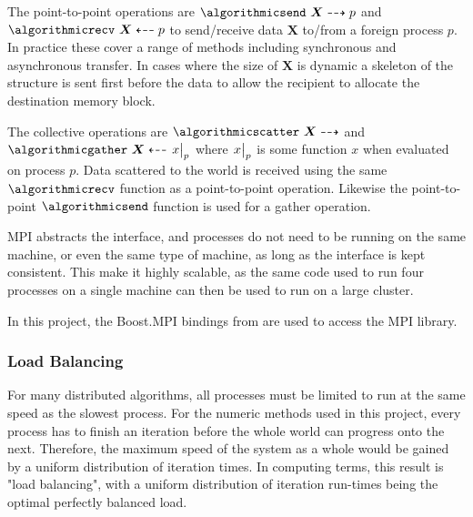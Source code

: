 \documentclass[twoside]{IIBproject}
\newcommand{\vect} [1] {\bm{#1}}
\newcommand{\dra}{\dashrightarrow}
\newcommand{\dla}{\dashleftarrow}
\numberwithin{figure}{section}
\begin{document}
            The point-to-point operations are $\algorithmicsend\ \vect{X} \dra p$ and $\algorithmicrecv\ \vect{X} \dla p$ to send/receive data $\vect{X}$ to/from a foreign process $p$. In practice these cover a range of methods including synchronous and asynchronous transfer. In cases where the size of $\vect{X}$ is dynamic a skeleton of the structure is sent first before the data to allow the recipient to allocate the destination memory block. 

            The collective operations are $\algorithmicscatter\ \vect{X} \dra$ and $\algorithmicgather\ \vect{X} \dla \eval{x}_{p}$ where $\eval{x}_p$ is some function $x$ when evaluated on process $p$. Data scattered to the world is received using the same $\algorithmicrecv$ function as a point-to-point operation. Likewise the point-to-point $\algorithmicsend$ function is used for a gather operation.

            MPI abstracts the interface, and processes do not need to be running on the same machine, or even the same type of machine, as long as the interface is kept consistent. This make it highly scalable, as the same code used to run four processes on a single machine can then be used to run on a large cluster. 

            In this project, the Boost.MPI bindings from \cite{boost16} are used to access the MPI library. 



        \subsubsection{Load Balancing} %
            \label{sec:loadbalancing}

            For many distributed algorithms, all processes must be limited to run at the same speed as the slowest process. For the numeric methods used in this project, every process has to finish an iteration before the whole world can progress onto the next. Therefore, the maximum speed of the system as a whole would be gained by a uniform distribution of iteration times. In computing terms, this result is "load balancing", with a uniform distribution of iteration run-times being the optimal perfectly balanced load. 



\end{document}
